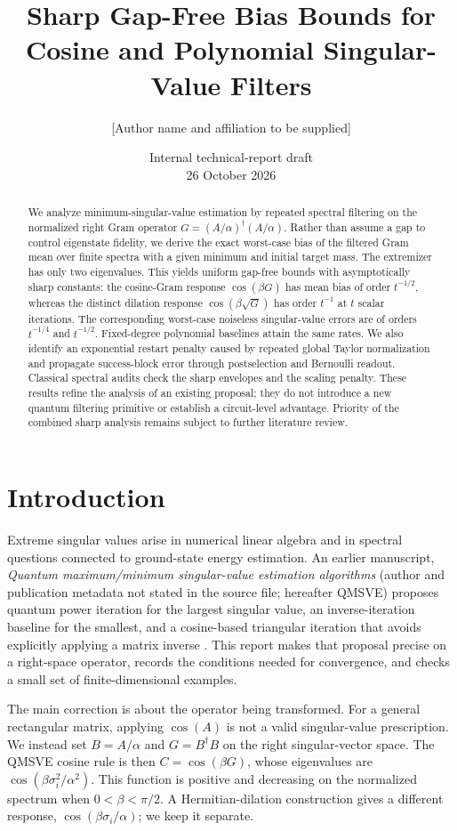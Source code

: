 \documentclass[11pt]{article}
\title{Sharp Gap-Free Bias Bounds for\\
Cosine and Polynomial Singular-Value Filters}
\author{[Author name and affiliation to be supplied]}
\date{Internal technical-report draft\\26 October 2026}
\begin{document}
\maketitle
\begin{abstract}
We analyze minimum-singular-value estimation by repeated spectral filtering on the normalized right Gram operator $G=(A/\alpha)^\dagger(A/\alpha)$. Rather than assume a gap to control eigenstate fidelity, we derive the exact worst-case bias of the filtered Gram mean over finite spectra with a given minimum and initial target mass. The extremizer has only two eigenvalues. This yields uniform gap-free bounds with asymptotically sharp constants: the cosine-Gram response $\cos(\beta G)$ has mean bias of order $t^{-1/2}$, whereas the distinct dilation response $\cos(\beta\sqrt G)$ has order $t^{-1}$ at $t$ scalar iterations. The corresponding worst-case noiseless singular-value errors are of orders $t^{-1/4}$ and $t^{-1/2}$. Fixed-degree polynomial baselines attain the same rates. We also identify an exponential restart penalty caused by repeated global Taylor normalization and propagate success-block error through postselection and Bernoulli readout. Classical spectral audits check the sharp envelopes and the scaling penalty. These results refine the analysis of an existing proposal; they do not introduce a new quantum filtering primitive or establish a circuit-level advantage. Priority of the combined sharp analysis remains subject to further literature review.
\end{abstract}
\section{Introduction}
Extreme singular values arise in numerical linear algebra and in spectral questions connected to ground-state energy estimation. An earlier manuscript, \emph{Quantum maximum/minimum singular-value estimation algorithms} (author and publication metadata not stated in the source file; hereafter QMSVE) proposes quantum power iteration for the largest singular value, an inverse-iteration baseline for the smallest, and a cosine-based triangular iteration that avoids explicitly applying a matrix inverse \cite{QMSVE}. This report makes that proposal precise on a right-space operator, records the conditions needed for convergence, and checks a small set of finite-dimensional examples.

The main correction is about the operator being transformed. For a general rectangular matrix, applying $\cos(A)$ is not a valid singular-value prescription. We instead set $B=A/\alpha$ and $G=B^\dagger B$ on the right singular-vector space. The QMSVE cosine rule is then $C=\cos(\beta G)$, whose eigenvalues are $\cos(\beta\sigma_i^2/\alpha^2)$. This function is positive and decreasing on the normalized spectrum when $0<\beta<\pi/2$. A Hermitian-dilation construction gives a different response, $\cos(\beta\sigma_i/\alpha)$; we keep it separate.
\end{document}
